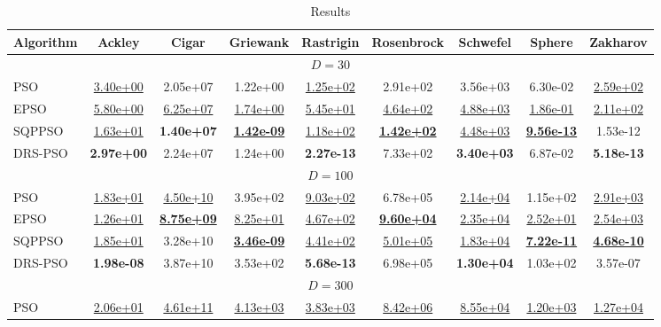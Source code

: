 \begin{table}
\centering
\caption{Results}
\label{tab:results}
\begin{tabular}{lcccccccc}
\toprule
Algorithm & Ackley & Cigar & Griewank & Rastrigin & Rosenbrock & Schwefel & Sphere & Zakharov \\
\midrule\multicolumn{9}{c}{ $D = 30$ }\\ \midrule
PSO & {\underline{3.40e+00}} & {2.05e+07} & {1.22e+00} & {\underline{1.25e+02}} & {2.91e+02} & {3.56e+03} & {6.30e-02} & {\underline{2.59e+02}} \\
EPSO & {\underline{5.80e+00}} & {\underline{6.25e+07}} & {\underline{1.74e+00}} & {\underline{5.45e+01}} & {\underline{4.64e+02}} & {\underline{4.88e+03}} & {\underline{1.86e-01}} & {\underline{2.11e+02}} \\
SQPPSO & {\underline{1.63e+01}} & \textbf{1.40e+07} & \textbf{\underline{1.42e-09}} & {\underline{1.18e+02}} & \textbf{\underline{1.42e+02}} & {\underline{4.48e+03}} & \textbf{\underline{9.56e-13}} & {1.53e-12} \\
DRS-PSO & \textbf{2.97e+00} & {2.24e+07} & {1.24e+00} & \textbf{2.27e-13} & {7.33e+02} & \textbf{3.40e+03} & {6.87e-02} & \textbf{5.18e-13} \\
\midrule\multicolumn{9}{c}{ $D = 100$ }\\ \midrule
PSO & {\underline{1.83e+01}} & {\underline{4.50e+10}} & {3.95e+02} & {\underline{9.03e+02}} & {6.78e+05} & {\underline{2.14e+04}} & {1.15e+02} & {\underline{2.91e+03}} \\
EPSO & {\underline{1.26e+01}} & \textbf{\underline{8.75e+09}} & {\underline{8.25e+01}} & {\underline{4.67e+02}} & \textbf{\underline{9.60e+04}} & {\underline{2.35e+04}} & {\underline{2.52e+01}} & {\underline{2.54e+03}} \\
SQPPSO & {\underline{1.85e+01}} & {3.28e+10} & \textbf{\underline{3.46e-09}} & {\underline{4.41e+02}} & {\underline{5.01e+05}} & {\underline{1.83e+04}} & \textbf{\underline{7.22e-11}} & \textbf{\underline{4.68e-10}} \\
DRS-PSO & \textbf{1.98e-08} & {3.87e+10} & {3.53e+02} & \textbf{5.68e-13} & {6.98e+05} & \textbf{1.30e+04} & {1.03e+02} & {3.57e-07} \\
\midrule\multicolumn{9}{c}{ $D = 300$ }\\ \midrule
PSO & {\underline{2.06e+01}} & {\underline{4.61e+11}} & {\underline{4.13e+03}} & {\underline{3.83e+03}} & {\underline{8.42e+06}} & {\underline{8.55e+04}} & {\underline{1.20e+03}} & {\underline{1.27e+04}} \\

\end{tabular}
\end{table}
